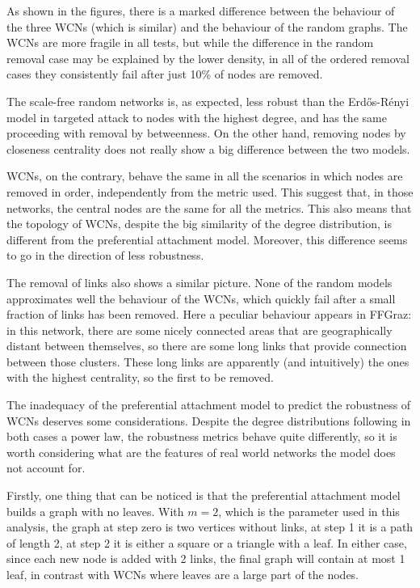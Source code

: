 \documentclass[oneside,openany]{memoir}
\begin{document}
As shown in the figures, there is a marked difference between the
behaviour of the three WCNs (which is similar) and the behaviour of the
random graphs. The WCNs are more fragile in all tests, but while the
difference in the random removal case may be explained by the lower
density, in all of the ordered removal cases they consistently fail
after just 10\% of nodes are removed.

The scale-free random networks is, as expected, less robust than the
Erd\H{o}s-Rényi model in targeted attack to nodes with the highest
degree, and has the same proceeding with removal by betweenness. On the
other hand, removing nodes by closeness centrality does not really show
a big difference between the two models.

WCNs, on the contrary, behave the same in all the scenarios in which
nodes are removed in order, independently from the metric used. This
suggest that, in those networks, the central nodes are the same for all
the metrics. This also means that the topology of WCNs, despite the big
similarity of the degree distribution, is different from the
preferential attachment model. Moreover, this difference seems to go in
the direction of less robustness.

The removal of links also shows a similar picture. None of the random
models approximates well the behaviour of the WCNs, which quickly fail
after a small fraction of links has been removed. Here a peculiar
behaviour appears in FFGraz: in this network, there are some nicely
connected areas that are geographically distant between themselves, so
there are some long links that provide connection between those
clusters. These long links are apparently (and intuitively) the ones
with the highest centrality, so the first to be removed.

The inadequacy of the preferential attachment model to predict the
robustness of WCNs deserves some considerations. Despite the degree
distributions following in both cases a power law, the robustness
metrics behave quite differently, so it is worth considering what are
the features of real world networks the model does not account for.

Firstly, one thing that can be noticed is that the preferential
attachment model builds a graph with no leaves. With $m = 2$, which is
the parameter used in this analysis, the graph at step zero is two
vertices without links, at step 1 it is a path of length 2, at step 2 it
is either a square or a triangle with a leaf.
In either case, since each new node is added with 2 links, the final
graph will contain at most 1 leaf, in contrast with WCNs where leaves
are a large part of the nodes.
\end{document}
